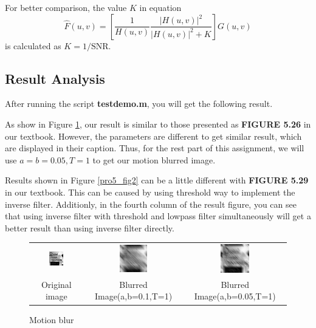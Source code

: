 \documentclass[11pt,a4paper]{article}
\begin{document}
For better comparison, the value $K$ in equation 
\begin{equation}
	\hat{F}(u,v)=\left[\frac{1}{H(u,v)}\frac{|H(u,v)|^2}{|H(u,v)|^2+K}\right]G(u,v)
\end{equation}
is calculated as $K=1/\textrm{SNR}$.

\subsection{Result Analysis}
After running the script \textbf{testdemo.m}, you will get the following result. 

As show in Figure \ref{pro5_fig1},  our result is similar to those presented as 
\textbf{FIGURE 5.26} in our textbook. However, the parameters are different to get
similar result, which are displayed in their caption. Thus, for the rest part of this assignment, 
we will use $a=b=0.05,T=1$ to get our motion blurred image.

Results shown in Figure \ref{pro5_fig2} can be a little different with \textbf{FIGURE 5.29}
in our textbook. This can be caused by using threshold way to implement the inverse filter.
Additionly, in the fourth column of the result figure, you can see that using inverse filter with
threshold and lowpass filter simultaneously will get a better result than using inverse filter
directly.

\begin{figure}[!htbp]
	\centering
	\begin{tabular}{ccc} 
		\includegraphics[width=0.3\textwidth]{pro5/5_26_a}&
		\includegraphics[width=0.3\textwidth]{pro5/5_26_a_b}&
		\includegraphics[width=0.3\textwidth]{pro5/5_26_b} \\
		Original image &  Blurred Image(a,b=0.1,T=1) &  Blurred Image(a,b=0.05,T=1)
	\end{tabular}
	\caption{Motion blur}
	\label{pro5_fig1}
\end{figure}
\end{document}
